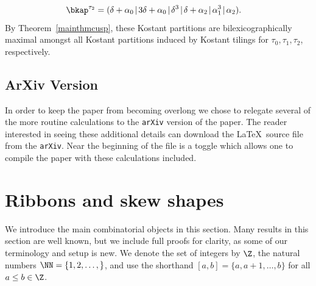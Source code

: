 \begin{exam}
\begin{align*}
\bkap^{\tau_2} &= (\delta + \alpha_0  \hspace{-0.5mm} \mid \hspace{-0.5mm} 3\delta + \alpha_0  \hspace{-0.5mm} \mid \hspace{-0.5mm}  \delta^3  \hspace{-0.5mm} \mid \hspace{-0.5mm} \delta + \alpha_2  \hspace{-0.5mm} \mid \hspace{-0.5mm} \alpha_1^3  \hspace{-0.5mm} \mid \hspace{-0.5mm} \alpha_2).
\end{align*}
By Theorem~\ref{mainthmcusp}, these Kostant partitions are bilexicographically maximal amongst all Kostant partitions induced by Kostant tilings for \(\tau_0, \tau_1, \tau_2\), respectively. 
\end{exam}

\subsection{ArXiv Version}\label{SS:ArxivVersion}  In order to keep the paper from becoming overlong we chose to relegate several of the more routine calculations to the \texttt{arXiv} version of the paper.  The reader interested in seeing these additional details can download the \LaTeX~source file from the \texttt{arXiv}.  Near the beginning of the file is a toggle which allows one to compile the paper with these calculations included.

\section{Ribbons and skew shapes}\label{skewshapesec}
We introduce the main combinatorial objects in this section. Many results in this section are well known, but we include full proofs for clarity, as some of our terminology and setup is new. 
We denote the set of integers by \(\Z\), the natural numbers \(\NN = \{1,2,\ldots,\}\), and use the shorthand \([a,b] = \{a, a+1, \ldots, b\}\) for all \(a\leq b \in \Z\).


